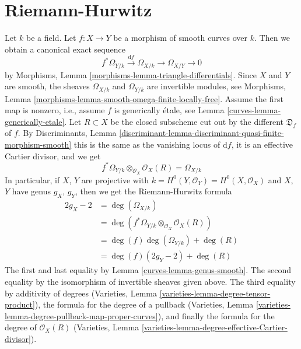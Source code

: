 \section{Riemann-Hurwitz}
\label{curves-section-riemann-hurewitz}
Let $k$ be a field. Let $f : X \to Y$ be a morphism of smooth curves over $k$.
Then we obtain a canonical exact sequence
$$
f^*\Omega_{Y/k} \xrightarrow{\text{d}f} \Omega_{X/k}
\longrightarrow \Omega_{X/Y} \longrightarrow 0
$$
by Morphisms, Lemma \ref{morphisms-lemma-triangle-differentials}.
Since $X$ and $Y$ are smooth, the sheaves $\Omega_{X/k}$ and
$\Omega_{Y/k}$ are invertible modules, see
Morphisms, Lemma \ref{morphisms-lemma-smooth-omega-finite-locally-free}.
Assume the first map is nonzero, i.e., assume $f$ is generically
\'etale, see Lemma \ref{curves-lemma-generically-etale}. Let $R \subset X$
be the closed subscheme cut out by the different $\mathfrak{D}_f$ of $f$.
By Discriminants, Lemma
\ref{discriminant-lemma-discriminant-quasi-finite-morphism-smooth}
this is the same as the vanishing locus of $\text{d}f$, it is
an effective Cartier divisor, and we get
$$
f^*\Omega_{Y/k} \otimes_{\mathcal{O}_X} \mathcal{O}_X(R) = \Omega_{X/k}
$$
In particular, if $X$, $Y$ are projective with
$k = H^0(Y, \mathcal{O}_Y) = H^0(X, \mathcal{O}_X)$
and $X$, $Y$ have genus $g_X$, $g_Y$, then we get the
Riemann-Hurwitz formula
\begin{align*}
2g_X - 2 & =
\deg(\Omega_{X/k}) \\
& =
\deg(f^*\Omega_{Y/k} \otimes_{\mathcal{O}_X} \mathcal{O}_X(R)) \\
& =
\deg(f) \deg(\Omega_{Y/k}) + \deg(R) \\
& =
\deg(f) (2g_Y - 2) + \deg(R)
\end{align*}
The first and last equality by Lemma \ref{curves-lemma-genus-smooth}.
The second equality by the isomorphism of invertible sheaves given above.
The third equality by additivity of degrees
(Varieties, Lemma \ref{varieties-lemma-degree-tensor-product}),
the formula for the degree of a pullback
(Varieties, Lemma \ref{varieties-lemma-degree-pullback-map-proper-curves}),
and finally the formula for the degree of $\mathcal{O}_X(R)$
(Varieties, Lemma \ref{varieties-lemma-degree-effective-Cartier-divisor}).

